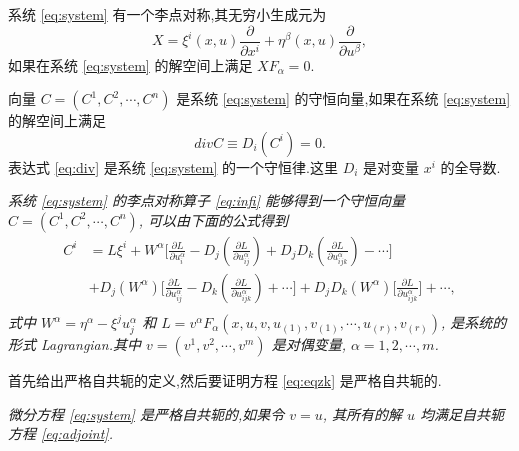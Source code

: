 系统 \eqref{eq:system} 有一个李点对称,其无穷小生成元为
\begin{equation}\label{eq:infi}
X=\xi^i(x,u)\frac{\partial}{\partial x^i}+\eta^\beta(x,u)\frac{\partial}{\partial u^\beta},
\end{equation}
如果在系统 \eqref{eq:system} 的解空间上满足 $XF_\alpha=0$.

向量 $C=(C^1,C^2,\cdots,C^n)$ 是系统 \eqref{eq:system} 的守恒向量,如果在系统 \eqref{eq:system} 的解空间上满足
\begin{equation}\label{eq:div}
divC\equiv D_i(C^i)=0.
\end{equation}
表达式 \eqref{eq:div} 是系统 \eqref{eq:system} 的一个守恒律.这里 $D_i$ 是对变量 $x^i$ 的全导数.

\begin{theorem}
\emph{系统 \eqref{eq:system} 的李点对称算子 \eqref{eq:infi} 能够得到一个守恒向量 $C=(C^1,C^2,\cdots,C^n)$, 可以由下面的公式得到
\begin{equation*}
\begin{aligned}
C^i&=L\xi^i+W^\alpha \bigg[\frac{\partial L}{\partial u^\alpha_i}-D_j(\frac{\partial L}{\partial u^\alpha_{ij}})+D_jD_k(\frac{\partial L}{\partial u^\alpha_{ijk}})-\cdots\bigg]\\
&+D_j(W^\alpha)\bigg[\frac{\partial L}{\partial u^\alpha_{ij}}-D_k(\frac{\partial L}{\partial u^\alpha_{ijk}})+\cdots\bigg]+D_jD_k(W^\alpha)\bigg[\frac{\partial L}{\partial u^\alpha_{ijk}}\bigg]+\cdots,\\
\end{aligned}
\end{equation*}
式中 $W^\alpha=\eta^\alpha-\xi^ju^\alpha_j$ 和 $L=v^\alpha F_\alpha(x,u,v,u_{(1)},v_{(1)},\cdots,u_{(r)},v_{(r)})$, 是系统的形式 Lagrangian.其中 $v= (v^1,v^2,\cdots,v^m)$ 是对偶变量, $\alpha=1,2,\cdots, m$.}
\end{theorem}

首先给出严格自共轭的定义,然后要证明方程 \eqref{eq:eqzk} 是严格自共轭的.

\begin{definition}[严格自共轭]
	\emph{微分方程 \eqref{eq:system} 是严格自共轭的,如果令 $v=u$, 其所有的解 $u$ 均满足自共轭方程 \eqref{eq:adjoint}.}
\end{definition}

%

